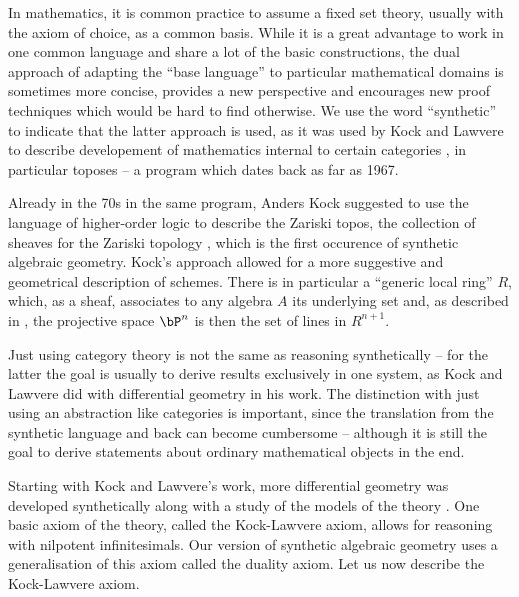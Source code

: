 
In mathematics, it is common practice to assume a fixed set theory, usually with the axiom of choice, as a common basis. While it is a great advantage to work in one common language and share a lot of the basic constructions, the dual approach of adapting the  ``base language'' to particular mathematical domains is sometimes more concise, provides a new perspective and encourages new proof techniques which would be hard to find otherwise.
We use the word ``synthetic'' to indicate that the latter approach is used,
as it was used by Kock and Lawvere to describe developement of mathematics internal to certain categories \cite{lawvere-categorical-dynamics}, in particular toposes -- a program which dates back as far as 1967.

Already in the 70s in the same program, Anders Kock suggested to use the language of higher-order logic \cite{Church40} to describe the Zariski topos, the collection of sheaves for the Zariski topology \cite{Kock74,kockreyes}, which is the first occurence of synthetic algebraic geometry.
Kock's approach allowed for a more suggestive and geometrical description of schemes.
There is in particular a ``generic local ring'' $R$, which, as a sheaf, associates to any algebra $A$ its underlying set and, as described in \cite{kockreyes}, the projective space $\bP^n$ is then the set of lines in $R^{n+1}$.

Just using category theory is not the same as reasoning synthetically -- for the latter the goal is usually to derive results exclusively in one system,
as Kock and Lawvere did with differential geometry in his work.
The distinction with just using an abstraction like categories is important, since the translation from the synthetic language and back can become cumbersome -- although it is still the goal to derive statements about ordinary mathematical objects in the end.

Starting with Kock and Lawvere's work, more differential geometry was developed synthetically \cite{kock-sdg} along with a study of the models of the theory \cite{moerdijk-reyes}.
One basic axiom of the theory, called the Kock-Lawvere axiom, allows for reasoning with nilpotent infinitesimals. Our version of synthetic algebraic geometry uses a generalisation of this axiom called the duality axiom. Let us now describe the Kock-Lawvere axiom.

